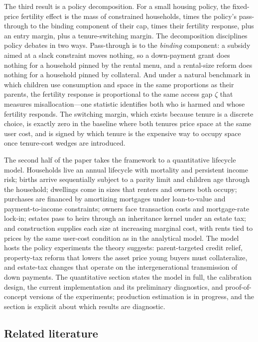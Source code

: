 \documentclass[11pt]{article}
\newcommand{\1}{\mathbf 1}
\begin{document}
The third result is a policy decomposition. For a small housing policy, the fixed-price fertility effect is the mass of constrained households, times the policy's pass-through to the binding component of their cap, times their fertility response, plus an entry margin, plus a tenure-switching margin. The decomposition disciplines policy debates in two ways. Pass-through is to the \emph{binding} component: a subsidy aimed at a slack constraint moves nothing, so a down-payment grant does nothing for a household pinned by the rental menu, and a rental-size reform does nothing for a household pinned by collateral. And under a natural benchmark in which children use consumption and space in the same proportions as their parents, the fertility response is proportional to the same access gap $\zeta$ that measures misallocation---one statistic identifies both who is harmed and whose fertility responds. The switching margin, which exists because tenure is a discrete choice, is exactly zero in the baseline where both tenures price space at the same user cost, and is signed by which tenure is the expensive way to occupy space once tenure-cost wedges are introduced.

The second half of the paper takes the framework to a quantitative lifecycle model. Households live an annual lifecycle with mortality and persistent income risk; births arrive sequentially subject to a parity limit and children age through the household; dwellings come in sizes that renters and owners both occupy; purchases are financed by amortizing mortgages under loan-to-value and payment-to-income constraints; owners face transaction costs and mortgage-rate lock-in; estates pass to heirs through an inheritance kernel under an estate tax; and construction supplies each size at increasing marginal cost, with rents tied to prices by the same user-cost condition as in the analytical model. The model hosts the policy experiments the theory suggests: parent-targeted credit relief, property-tax reform that lowers the asset price young buyers must collateralize, and estate-tax changes that operate on the intergenerational transmission of down payments. The quantitative section states the model in full, the calibration design, the current implementation and its preliminary diagnostics, and proof-of-concept versions of the experiments; production estimation is in progress, and the section is explicit about which results are diagnostic.

\subsection{Related literature}
\label{sec:literature}
\end{document}
